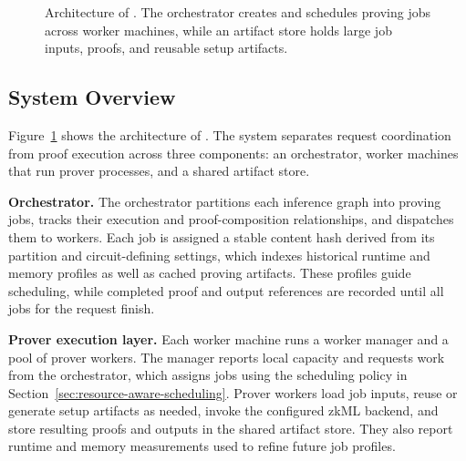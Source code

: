 \begin{figure}[t]
\caption{
Architecture of \TITLE{}. The orchestrator creates and schedules proving jobs across worker machines, while an artifact store holds large job inputs, proofs, and reusable setup artifacts.
}
\label{fig:architecture}
\end{figure}

\subsection{System Overview}
\label{sec:system-overview}

Figure~\ref{fig:architecture} shows the architecture of \TITLE{}. The system separates request coordination from proof execution across three components: an orchestrator, worker machines that run prover processes, and a shared artifact store.

\noindent\textbf{Orchestrator.}
The orchestrator partitions each inference graph into proving jobs, tracks their execution and proof-composition relationships, and dispatches them to workers. Each job is assigned a stable content hash derived from its partition and circuit-defining settings, which indexes historical runtime and memory profiles as well as cached proving artifacts. These profiles guide scheduling, while completed proof and output references are recorded until all jobs for the request finish.

\noindent\textbf{Prover execution layer.}
Each worker machine runs a worker manager and a pool of prover workers. The manager reports local capacity and requests work from the orchestrator, which assigns jobs using the scheduling policy in Section~\ref{sec:resource-aware-scheduling}. Prover workers load job inputs, reuse or generate setup artifacts as needed, invoke the configured zkML backend, and store resulting proofs and outputs in the shared artifact store. They also report runtime and memory measurements used to refine future job profiles.

